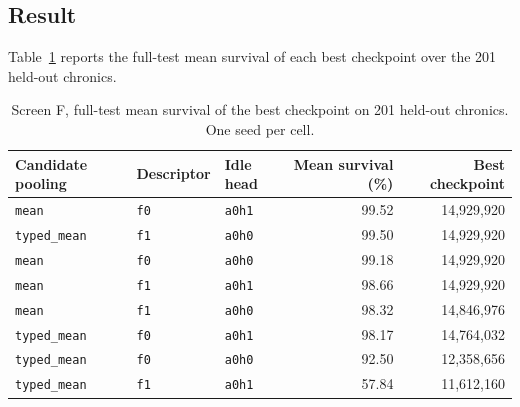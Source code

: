 \subsection*{Result}
Table~\ref{tab:screen-f-fulltest} reports the full-test mean survival of each best
checkpoint over the 201 held-out chronics.

\begin{table}[H]
  \centering
  \small
  \caption{Screen F, full-test mean survival of the best checkpoint on 201 held-out
  chronics. One seed per cell.}
  \label{tab:screen-f-fulltest}
  \setlength{\tabcolsep}{6pt}
  \begin{tabular}{lllrr}
    \toprule
    Candidate pooling & Descriptor & Idle head & Mean survival (\%) & Best checkpoint \\
    \midrule
    \texttt{mean}       & \texttt{f0} & \texttt{a0h1} & 99.52 & 14{,}929{,}920 \\
    \texttt{typed\_mean} & \texttt{f1} & \texttt{a0h0} & 99.50 & 14{,}929{,}920 \\
    \texttt{mean}       & \texttt{f0} & \texttt{a0h0} & 99.18 & 14{,}929{,}920 \\
    \texttt{mean}       & \texttt{f1} & \texttt{a0h1} & 98.66 & 14{,}929{,}920 \\
    \texttt{mean}       & \texttt{f1} & \texttt{a0h0} & 98.32 & 14{,}846{,}976 \\
    \texttt{typed\_mean} & \texttt{f0} & \texttt{a0h1} & 98.17 & 14{,}764{,}032 \\
    \texttt{typed\_mean} & \texttt{f0} & \texttt{a0h0} & 92.50 & 12{,}358{,}656 \\
    \texttt{typed\_mean} & \texttt{f1} & \texttt{a0h1} & 57.84 & 11{,}612{,}160 \\
    \bottomrule
  \end{tabular}
\end{table}


